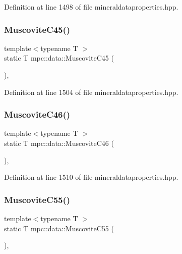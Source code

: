 Definition at line 1498 of file mineraldataproperties.\+hpp.

\mbox{\label{namespacempc_1_1data_a7bee38c9d916f9c9743bf689bc17ecbb}} 
\subsubsection{\texorpdfstring{Muscovite\+C45()}{MuscoviteC45()}}
{\footnotesize\ttfamily template$<$typename T $>$ \\
static T mpc\+::data\+::\+Muscovite\+C45 (\begin{DoxyParamCaption}{ }\end{DoxyParamCaption})\hspace{0.3cm}{\ttfamily [inline]}, {\ttfamily [static]}}



Definition at line 1504 of file mineraldataproperties.\+hpp.

\mbox{\label{namespacempc_1_1data_af48c09001fb1cdb99362aa0b8e0f1aa8}} 
\subsubsection{\texorpdfstring{Muscovite\+C46()}{MuscoviteC46()}}
{\footnotesize\ttfamily template$<$typename T $>$ \\
static T mpc\+::data\+::\+Muscovite\+C46 (\begin{DoxyParamCaption}{ }\end{DoxyParamCaption})\hspace{0.3cm}{\ttfamily [inline]}, {\ttfamily [static]}}



Definition at line 1510 of file mineraldataproperties.\+hpp.

\mbox{\label{namespacempc_1_1data_ab21878b361670029239ebd76345a66b9}} 
\subsubsection{\texorpdfstring{Muscovite\+C55()}{MuscoviteC55()}}
{\footnotesize\ttfamily template$<$typename T $>$ \\
static T mpc\+::data\+::\+Muscovite\+C55 (\begin{DoxyParamCaption}{ }\end{DoxyParamCaption})\hspace{0.3cm}{\ttfamily [inline]}, {\ttfamily [static]}}



